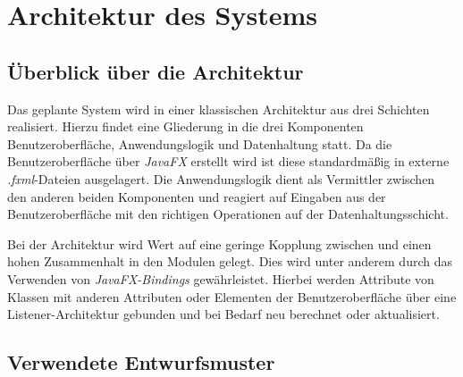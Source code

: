 \documentclass[11pt]{article}
\begin{document}
\section{Architektur des Systems}

\subsection{Überblick über die Architektur}

Das geplante System wird in einer klassischen Architektur aus drei Schichten realisiert. Hierzu findet eine Gliederung in die drei Komponenten Benutzeroberfläche, Anwendungslogik und Datenhaltung statt. Da die Benutzeroberfläche über \textit{JavaFX} erstellt wird ist diese standardmäßig in externe \textit{.fxml}-Dateien ausgelagert. Die Anwendungslogik dient als Vermittler zwischen den anderen beiden Komponenten und reagiert auf Eingaben aus der Benutzeroberfläche mit den richtigen Operationen auf der Datenhaltungsschicht.

Bei der Architektur wird Wert auf eine geringe Kopplung zwischen und einen hohen Zusammenhalt in den Modulen gelegt. Dies wird unter anderem durch das Verwenden von \textit{JavaFX-Bindings} gewährleistet. Hierbei werden Attribute von Klassen mit anderen Attributen oder Elementen der Benutzeroberfläche über eine Listener-Architektur gebunden und bei Bedarf neu berechnet oder aktualisiert.

\subsection{Verwendete Entwurfsmuster}
\end{document}
